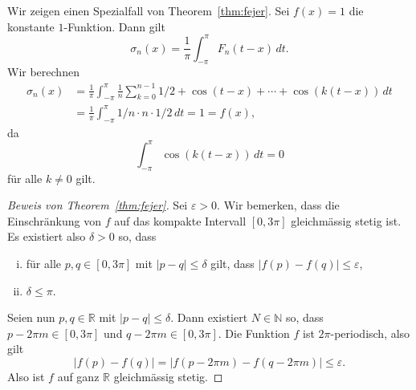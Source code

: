 \documentclass[../main.tex]{subfiles}
\begin{document}
\begin{example}
  Wir zeigen einen Spezialfall von Theorem~\ref{thm:fejer}.
  Sei $f(x) = 1$ die konstante $1$-Funktion.
  Dann gilt
  \[
    \sigma_n(x) = \frac{1}{\pi} \int_{-\pi}^{\pi} F_n(t-x) \, dt.
  \]
  Wir berechnen
  \begin{align*}
    \sigma_n(x)
    & = \frac{1}{\pi} \int_{-\pi}^{\pi} \frac{1}{n} \sum_{k=0}^{n-1}
    1/2 + \cos(t-x) + \cdots + \cos(k(t-x)) \, dt\\
    &= \frac{1}{\pi} \int_{-\pi}^{\pi} 1/n \cdot n \cdot 1/2 \, dt
    = 1 = f(x),
  \end{align*}
  da
  \[
    \int_{-\pi}^{\pi} \cos(k(t-x)) \, dt = 0
  \]
  für alle $k \neq 0$ gilt.
\end{example}


\begin{proof}[Beweis von Theorem~\ref{thm:fejer}]
  Sei $\varepsilon > 0$. Wir bemerken, dass
  die Einschränkung von $f$ auf das kompakte Intervall
  $[0, 3\pi]$ gleichmässig stetig ist.
  Es existiert also $\delta > 0$ so,
  dass
  \begin{enumerate}[(i)]
    \item für alle $p, q \in [0, 3\pi]$ mit
      $|p - q| \leq \delta$ gilt, dass
      $|f(p) - f(q)| \leq \varepsilon$,
    \item $\delta \leq \pi$.
  \end{enumerate}
  Seien nun $p, q \in \mathbb{R}$ mit $|p - q | \leq \delta$.
  Dann existiert $N \in \mathbb{N}$ 
  so, 
  dass $p - 2\pi m \in [0, 3\pi]$ und $q - 2\pi m \in [0, 3\pi]$.
  Die Funktion $f$ ist $2\pi$-periodisch, also gilt
  \[
    |f(p) - f(q)| 
    = |f(p - 2 \pi m) - f(q - 2\pi m)| \leq \varepsilon.
  \]
  Also ist $f$ auf ganz $ \mathbb{R}$
  gleichmässig stetig.
  

\end{proof}
\end{document}
